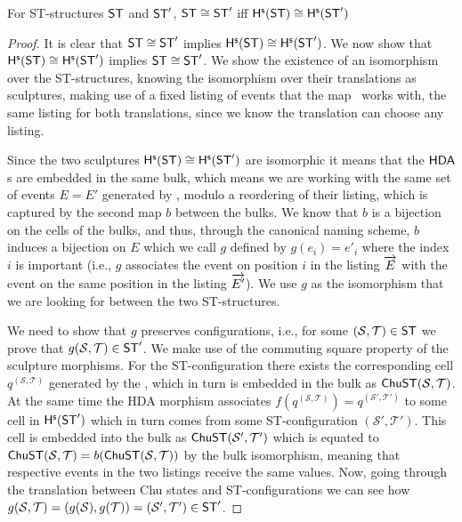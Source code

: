     \begin{proposition}
        \label{prop:ST-to-Sculpture-iso}
         For ST-structures $\mathsf{ST}$ and $\mathsf{ST}'$, $\mathsf{ST}\cong \mathsf{ST}'$ iff\/ $\mathsf{H}^{\mathsf{s}}(\mathsf{ST})\cong\mathsf{H}^{\mathsf{s}}(\mathsf{ST}')$
    \end{proposition}

    \begin{proof}
         It is clear that $\mathsf{ST}\cong \mathsf{ST}'$ implies $\mathsf{H}^{\mathsf{s}}(\mathsf{ST})\cong\mathsf{H}^{\mathsf{s}}(\mathsf{ST}')$.  We now show that $\mathsf{H}^{\mathsf{s}}(\mathsf{ST})\cong\mathsf{H}^{\mathsf{s}}(\mathsf{ST}')$ implies $\mathsf{ST}\cong\mathsf{ST}'$. We show the existence of an isomorphism over the ST-structures, knowing the isomorphism over their translations as sculptures, making use of a fixed listing of events that the map \stintosculpture\ works with, the same listing for both translations, since we know the translation can choose any listing.

        Since the two sculptures $\mathsf{H}^{\mathsf{s}}(\mathsf{ST})\cong\mathsf{H}^{\mathsf{s}}(\mathsf{ST}')$ are isomorphic it means that the $\text{\textup{\textsf{HDA}}}$s are embedded in the same bulk, which means we are working with the same set of events $E=E'$ generated by \stintosculpture, modulo a reordering of their listing, which is captured by the second map $b$ between the bulks. We know that $b$ is a bijection on the cells of the bulks, and thus, through the canonical naming scheme, $b$ induces a bijection on $E$ which we call $g$ defined by $g(e_{i})=e'_{i}$ where the index $i$ is important (i.e., $g$ associates the event on position $i$ in the listing $\overrightarrow{E}$ with the event on the same position in the listing $\overrightarrow{E'}$). We use $g$ as the isomorphism that we are looking for between the two ST-structures. 

        We need to show that $g$ preserves configurations, i.e., for some $(\mathcal{S},\mathcal{T})\in\mathsf{ST}$ we prove that $g(\mathcal{S},\mathcal{T}) \in \mathsf{ST}'$. We make use of the commuting square property of the sculpture morphisms. For the ST-configuration there exists the corresponding cell $q^{(\mathcal{S}, \mathcal{T})}$ generated by the \stintosculpture, which in turn is embedded in the bulk as $\mathsf{ChuST}(\mathcal{S},\mathcal{T})$. At the same time the HDA morphism associates $f(q^{(\mathcal{S},\mathcal{T})})=q^{(\mathcal{S}',\mathcal{T}')}$ to some cell in $\mathsf{H}^{\mathsf{s}}(\mathsf{ST}')$ which in turn comes from some ST-configuration $(\mathcal{S}',\mathcal{T}')$. This cell is embedded into the bulk as $\mathsf{ChuST}(\mathcal{S}',\mathcal{T}')$ which is equated to $\mathsf{ChuST}(\mathcal{S},\mathcal{T})=b(\mathsf{ChuST}(\mathcal{S},\mathcal{T}))$ by the bulk isomorphism, meaning that respective events in the two listings receive the same values. Now, going through the translation between Chu states and ST-configurations we can see how $g(\mathcal{S},\mathcal{T})=(g(\mathcal{S}),g(\mathcal{T}))=(\mathcal{S}',\mathcal{T}')\in\mathsf{ST}'$.


\end{proof}
